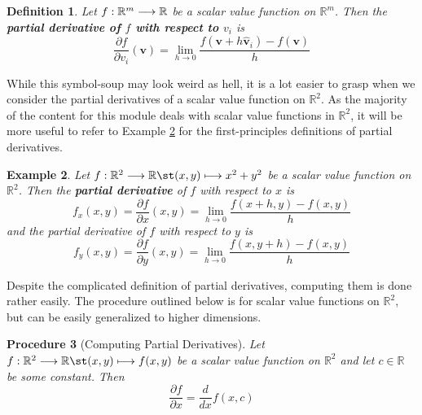\documentclass[12pt]{book}
\newcommand{\rbb}{\mathbb{R}}
\theoremstyle{definitionstyle}
\newtheorem{definition}{Definition}[section]
\newtheorem{example}[definition]{Example}
\newtheorem{procedure}[definition]{Procedure}
\numberwithin{equation}{section}
\begin{document}
\vspace{0.5cm}

\begin{definition}
    Let $\func{f}{\rbb^m}{\rbb}$ be a scalar value function on $\rbb^m$. Then the \textbf{partial derivative of $f$ with respect to $v_i$} is
    \begin{equation}
	\frac{\partial f}{\partial v_i}(\mathbf{v}) = \lim_{h \to 0} \frac{f(\mathbf{v} + h\mathbf{\hat{v}}_i) - f(\mathbf{v})}{h}
    \end{equation}
\end{definition}

While this symbol-soup may look weird as hell, it is a lot easier to grasp when we consider the partial derivatives of a scalar value function on $\rbb^2$. As the majority of the content for this module deals with scalar value functions in $\rbb^2$, it will be more useful to refer to Example \ref{2d-partial-derivative} for the first-principles definitions of partial derivatives.

\vspace{0.5cm}

\begin{example}\label{2d-partial-derivative}
    Let $\func[(x,y)][x^2+y^2]{f}{\rbb^2}{\rbb}$ be a scalar value function on $\rbb^2$. Then the \textbf{partial derivative} of $f$ with respect to $x$ is
	\begin{equation}
	    f_x(x,y) = \frac{\partial f}{\partial x}(x,y) = \lim_{h \to 0} \frac{f(x + h, y) - f(x,y)}{h}
	\end{equation}
	and the partial derivative of $f$ with respect to $y$ is
	\begin{equation}
	    f_y(x,y) = \frac{\partial f}{\partial y}(x,y) = \lim_{h \to 0} \frac{f(x, y + h) - f(x,y)}{h}
	\end{equation}
\end{example}

\vspace{0.5cm}

Despite the complicated definition of partial derivatives, computing them is done rather easily. The procedure outlined below is for scalar value functions on $\rbb^2$, but can be easily generalized to higher dimensions.

\begin{procedure}[Computing Partial Derivatives]
    Let $\func[(x,y)][f(x,y)]{f}{\rbb^2}{\rbb}$ be a scalar value function on $\rbb^2$ and let $c \in \rbb$ be some constant.
    Then
    \begin{equation}
	\frac{\partial f}{\partial x} = \frac{d}{dx}f(x,c)
    \end{equation}
\end{procedure}
\end{document}
